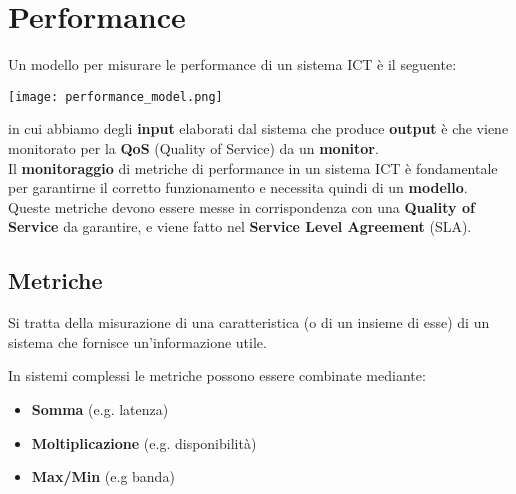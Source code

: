 \newpage
\section{Performance}
Un modello per misurare le performance di un sistema ICT è il seguente:
\begin{center}
	\texttt{[image: performance\_model.png]}
\end{center}
in cui abbiamo degli \textbf{input} elaborati dal sistema che produce \textbf{output} è che viene monitorato per la \textbf{QoS} (Quality of Service) da un \textbf{monitor}.\\
Il \textbf{monitoraggio} di metriche di performance in un sistema ICT è fondamentale per garantirne il corretto funzionamento e necessita quindi di un \textbf{modello}. Queste metriche devono essere messe in corrispondenza con una \textbf{Quality of Service} da garantire, e viene fatto nel \textbf{Service Level Agreement} (SLA).

\subsection{Metriche}
\begin{definition}[Metrica]
	Si tratta della misurazione di una caratteristica (o di un insieme di esse) di un sistema che fornisce un'informazione utile.
\end{definition}
In sistemi complessi le metriche possono essere combinate mediante:
\begin{itemize}
	\item \textbf{Somma} (e.g. latenza)
	\item \textbf{Moltiplicazione} (e.g. disponibilità)
	\item \textbf{Max/Min} (e.g banda)
\end{itemize}


